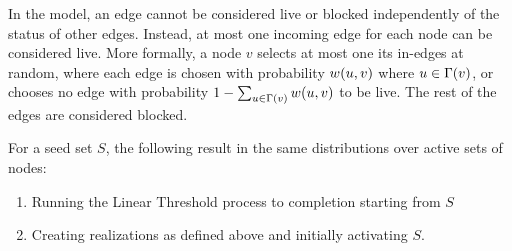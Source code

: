 In the \ltmodel{} model, an edge cannot be 
considered live or blocked independently of the status of other edges. Instead, at most one incoming edge 
for each node can be considered live. More formally, a node $v$ selects at most one its in-edges at random, where each edge
is chosen with probability $\f[w]{u, v}$ where $u \in \f[\Gamma]{v}$, or chooses no edge with probability 
$1 - \sum_{u \in \Gamma(v)} \f[w]{u,v}$ to be live. The rest of the edges are considered blocked.  

\begin{claim}
    For a seed set $S$, the following result in the same distributions over active sets of nodes: 
    \begin{enumerate}
        \item Running the Linear Threshold process to completion starting from $S$
        \item Creating realizations as defined above and initially activating $S$. 
    \end{enumerate}
\end{claim}
